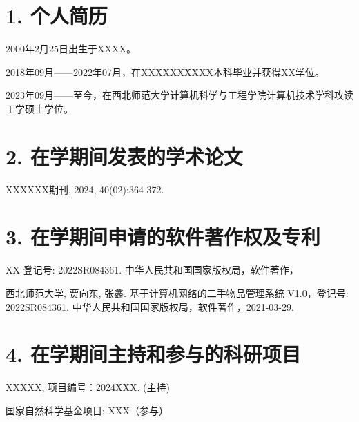 
\begin{achievements}

\section*{1. 个人简历}

\begin{enumerate}[label={[\arabic*] }]
\item \songti \fontsize{12pt}{15pt}\selectfont 2000年2月25日出生于XXXX。
\item 2018年09月——2022年07月，在XXXXXXXXXX本科毕业并获得XX学位。
\item 2023年09月——至今，在西北师范大学计算机科学与工程学院计算机技术学科攻读工学硕士学位。
\end{enumerate}

\section*{2. 在学期间发表的学术论文}

\begin{enumerate}[label={[\arabic*] }]
\item \songti \fontsize{12pt}{15pt}\selectfont XXXXXX期刊, 2024, 40(02):364-372.
\end{enumerate}

\section*{3. 在学期间申请的软件著作权及专利}
\begin{enumerate}[label={[\arabic*] }]
\item  	\songti \fontsize{12pt}{15pt}\selectfont XX 登记号: 2022SR084361. 中华人民共和国国家版权局，软件著作，
\item 	西北师范大学, 贾向东, 张鑫. 基于计算机网络的二手物品管理系统 V1.0，登记号: 2022SR084361. 中华人民共和国国家版权局，软件著作，2021-03-29. 
\end{enumerate}

\section*{4. 在学期间主持和参与的科研项目}
\begin{enumerate}[label={[\arabic*] }]
\item 	\songti \fontsize{12pt}{15pt}\selectfont XXXXX, 项目编号：2024XXX. (主持)
\item	国家自然科学基金项目: XXX（参与）
\end{enumerate}

\end{achievements}
